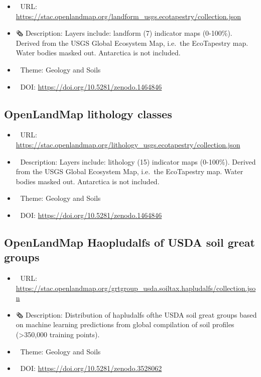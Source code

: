 \documentclass[
  graybox,natbib,nospthms]{svmono}
\providecommand{\tightlist}{%
  \setlength{\itemsep}{0pt}\setlength{\parskip}{0pt}}
\providecommand{\tightlist}{\setlength{\itemsep}{0pt}\setlength{\parskip}{0pt}}
\begin{document}
\begin{itemize}
\tightlist
\item
  🔗 URL: \url{https://stac.openlandmap.org/landform_usgs.ecotapestry/collection.json}
\item
  🗞 Description: Layers include: landform (7) indicator maps (0-100\%). Derived from the USGS Global Ecosystem Map, i.e.~the EcoTapestry map. Water bodies masked out. Antarctica is not included.
\item
  📝 Theme: Geology and Soils
\item
  📂 DOI: \url{https://doi.org/10.5281/zenodo.1464846}
\end{itemize}

\hypertarget{openlandmap-lithology-classes}{%
\subsection{OpenLandMap lithology classes}\label{openlandmap-lithology-classes}}

\begin{itemize}
\tightlist
\item
  🔗 URL: \url{https://stac.openlandmap.org/lithology_usgs.ecotapestry/collection.json}
\item
  📰 Description: Layers include: lithology (15) indicator maps (0-100\%). Derived from the USGS Global Ecosystem Map, i.e.~the EcoTapestry map. Water bodies masked out. Antarctica is not included.
\item
  📝 Theme: Geology and Soils
\item
  📂 DOI: \url{https://doi.org/10.5281/zenodo.1464846}
\end{itemize}

\hypertarget{openlandmap-haopludalfs-of-usda-soil-great-groups}{%
\subsection{OpenLandMap Haopludalfs of USDA soil great groups}\label{openlandmap-haopludalfs-of-usda-soil-great-groups}}

\begin{itemize}
\tightlist
\item
  🔗 URL: \url{https://stac.openlandmap.org/grtgroup_usda.soiltax.hapludalfs/collection.json}
\item
  🗞 Description: Distribution of hapludalfs ofthe USDA soil great groups based on machine learning predictions from global compilation of soil profiles (\textgreater350,000 training points).
\item
  📝 Theme: Geology and Soils
\item
  📂 DOI: \url{https://doi.org/10.5281/zenodo.3528062}
\end{itemize}
\end{document}
